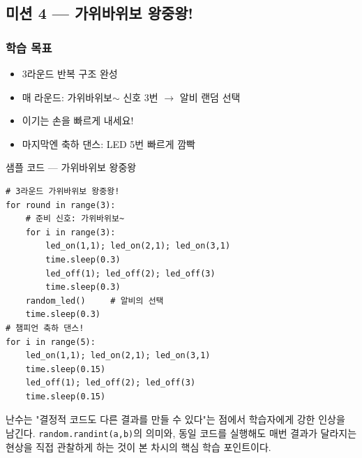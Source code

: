 \subsection{미션 4 --- 가위바위보 왕중왕!}
\label{subsec:ch06-m4}

\begin{storybox}
\end{storybox}

\subsubsection*{학습 목표}
\begin{itemize}[leftmargin=1.4em]
  \item 3라운드 반복 구조 완성
  \item 매 라운드: 가위바위보$\sim$ 신호 3번 $\rightarrow$ 알비 랜덤 선택
  \item 이기는 손을 빠르게 내세요!
  \item 마지막엔 축하 댄스: LED 5번 빠르게 깜빡
\end{itemize}

\begin{labbox}{샘플 코드 --- 가위바위보 왕중왕}
\begin{verbatim}
# 3라운드 가위바위보 왕중왕!
for round in range(3):
    # 준비 신호: 가위바위보~
    for i in range(3):
        led_on(1,1); led_on(2,1); led_on(3,1)
        time.sleep(0.3)
        led_off(1); led_off(2); led_off(3)
        time.sleep(0.3)
    random_led()     # 알비의 선택
    time.sleep(0.3)
# 챔피언 축하 댄스!
for i in range(5):
    led_on(1,1); led_on(2,1); led_on(3,1)
    time.sleep(0.15)
    led_off(1); led_off(2); led_off(3)
    time.sleep(0.15)
\end{verbatim}
\end{labbox}

\begin{keypoint}
난수는 "결정적 코드도 다른 결과를 만들 수 있다"는 점에서 학습자에게
강한 인상을 남긴다. \texttt{random.randint(a,b)}의 의미와, 동일 코드를
실행해도 매번 결과가 달라지는 현상을 직접 관찰하게 하는 것이 본 차시의
핵심 학습 포인트이다.
\end{keypoint}
